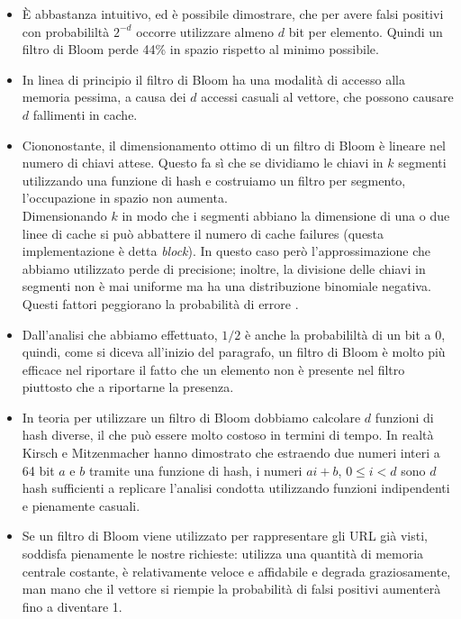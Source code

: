\begin{itemize}
    \item È abbastanza intuitivo, ed è possibile dimostrare, che per avere falsi positivi con probabililtà $2^{-d}$ occorre utilizzare almeno $d$ bit per elemento. Quindi un filtro di Bloom perde 44\% in spazio rispetto al minimo possibile.
    \item In linea di principio il filtro di Bloom ha una modalità di accesso alla memoria pessima, a causa dei $d$ accessi casuali al vettore, che possono causare $d$ fallimenti in cache.
    \item Ciononostante, il dimensionamento ottimo di un filtro di Bloom è lineare nel numero di chiavi attese. Questo fa sì che se dividiamo le chiavi in $k$ segmenti utilizzando una funzione di hash e costruiamo un filtro per segmento, l'occupazione in spazio non aumenta.\\
    Dimensionando $k$ in modo che i segmenti abbiano la dimensione di una o due linee di cache si può abbattere il numero di cache failures (questa implementazione è detta \textit{block}). In questo caso però l'approssimazione che abbiamo utilizzato perde di precisione; inoltre, la divisione delle chiavi in segmenti non è mai uniforme ma ha una distribuzione binomiale negativa. Questi fattori peggiorano la probabilità di errore \cite{Putze}.
    \item Dall'analisi che abbiamo effettuato, $1/2$ è anche la probabililtà di un bit a 0, quindi, come si diceva all'inizio del paragrafo, un filtro di Bloom è molto più efficace nel riportare il fatto che un elemento non è presente nel filtro piuttosto che a riportarne la presenza.
    \item In teoria per utilizzare un filtro di Bloom dobbiamo calcolare $d$ funzioni di hash diverse, il che può essere molto costoso in termini di tempo. In realtà Kirsch e Mitzenmacher hanno dimostrato che estraendo due numeri interi a 64 bit $a$ e $b$ tramite una funzione di hash, i numeri $ai + b$, $0 \leq i < d$ sono $d$ hash sufficienti a replicare l'analisi condotta utilizzando funzioni indipendenti e pienamente casuali.
    \item Se un filtro di Bloom viene utilizzato per rappresentare gli URL già visti, soddisfa pienamente le nostre richieste: utilizza una quantità di memoria centrale costante, è relativamente veloce e affidabile e degrada graziosamente, man mano che il vettore si riempie la probabilità di falsi positivi aumenterà fino a diventare 1.
\end{itemize}
